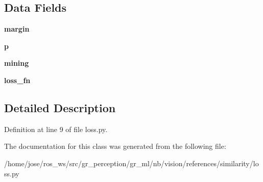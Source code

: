 \subsection*{Data Fields}
\begin{DoxyCompactItemize}
\item 
\mbox{\label{classloss_1_1TripletMarginLoss_a02eb265c634baacca3fe62f25e1522e9}} 
{\bfseries margin}
\item 
\mbox{\label{classloss_1_1TripletMarginLoss_a82cdf913c2126419dc2d1c92df33f368}} 
{\bfseries p}
\item 
\mbox{\label{classloss_1_1TripletMarginLoss_ae25e7e08b18e0bbcfa50cfb67863b9a9}} 
{\bfseries mining}
\item 
\mbox{\label{classloss_1_1TripletMarginLoss_ae0674fef62b3432f6531edb5d68d509d}} 
{\bfseries loss\+\_\+fn}
\end{DoxyCompactItemize}


\subsection{Detailed Description}


Definition at line 9 of file loss.\+py.



The documentation for this class was generated from the following file\+:\begin{DoxyCompactItemize}
\item 
/home/jose/ros\+\_\+ws/src/gr\+\_\+perception/gr\+\_\+ml/nb/vision/references/similarity/loss.\+py\end{DoxyCompactItemize}
